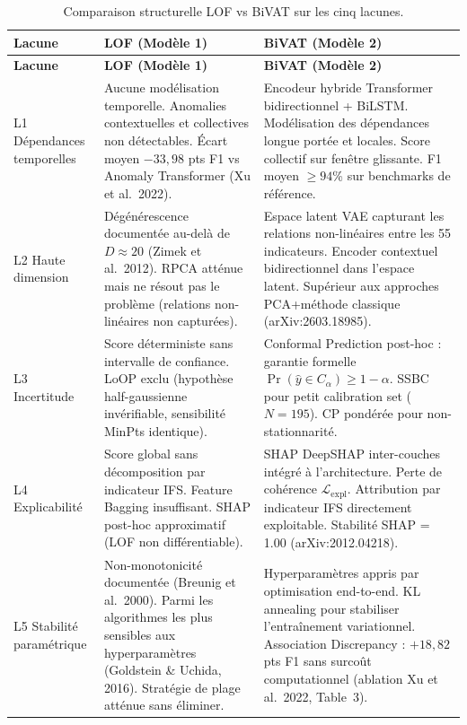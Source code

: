 \documentclass[12pt,a4paper]{article}
\begin{document}
\begin{longtable}{p{3cm}p{5.5cm}p{6cm}}
\caption{Comparaison structurelle LOF vs BiVAT sur les cinq lacunes.}
\label{tab:lof-bivat}\\
\toprule
\textbf{Lacune} & \textbf{LOF (Modèle 1)} & \textbf{BiVAT (Modèle 2)} \\
\midrule
\endfirsthead
\toprule
\textbf{Lacune} & \textbf{LOF (Modèle 1)} & \textbf{BiVAT (Modèle 2)} \\
\midrule
\endhead
\bottomrule\endlastfoot

L1  Dépendances temporelles &
Aucune modélisation temporelle. Anomalies contextuelles et collectives
non détectables. Écart moyen $-33{,}98$ pts F1 vs Anomaly Transformer
(Xu et al.\ 2022). &
Encodeur hybride Transformer bidirectionnel + BiLSTM. Modélisation des
dépendances longue portée et locales. Score collectif sur fenêtre glissante.
F1 moyen $\geq 94$\% sur benchmarks de référence. \\
\midrule

L2  Haute dimension &
Dégénérescence documentée au-delà de $D \approx 20$ (Zimek et al.\ 2012).
RPCA atténue mais ne résout pas le problème (relations non-linéaires
non capturées). &
Espace latent VAE capturant les relations non-linéaires entre les 55
indicateurs. Encoder contextuel bidirectionnel dans l'espace latent.
Supérieur aux approches PCA+méthode classique (arXiv:2603.18985). \\
\midrule

L3  Incertitude &
Score déterministe sans intervalle de confiance. LoOP exclu (hypothèse
half-gaussienne invérifiable, sensibilité MinPts identique). &
Conformal Prediction post-hoc : garantie formelle
$\Pr(\hat{y} \in C_\alpha) \geq 1-\alpha$. SSBC pour petit calibration set
($N=195$). CP pondérée pour non-stationnarité. \\
\midrule

L4  Explicabilité &
Score global sans décomposition par indicateur IFS. Feature Bagging
insuffisant. SHAP post-hoc approximatif (LOF non différentiable). &
SHAP DeepSHAP inter-couches intégré à l'architecture. Perte de cohérence
$\mathcal{L}_{\mathrm{expl}}$. Attribution par indicateur IFS directement
exploitable. Stabilité SHAP = 1.00 (arXiv:2012.04218). \\
\midrule

L5  Stabilité paramétrique &
Non-monotonicité documentée (Breunig et al.\ 2000). Parmi les algorithmes
les plus sensibles aux hyperparamètres (Goldstein \& Uchida, 2016). Stratégie
de plage atténue sans éliminer. &
Hyperparamètres appris par optimisation end-to-end. KL annealing pour
stabiliser l'entraînement variationnel. Association Discrepancy : $+18{,}82$
pts F1 sans surcoût computationnel (ablation Xu et al.\ 2022, Table~3). \\
\end{longtable}
\end{document}
